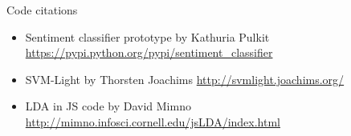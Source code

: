 \documentclass{article}
\begin{document}
Code citations
\begin{itemize}
\item Sentiment classifier prototype by Kathuria Pulkit 
\newline
\url{https://pypi.python.org/pypi/sentiment_classifier}

\item SVM-Light by Thorsten Joachims
\newline
\url{http://svmlight.joachims.org/}

\item LDA in JS code by David Mimno
\newline
\url{http://mimno.infosci.cornell.edu/jsLDA/index.html}

\end{itemize}
\end{document}

